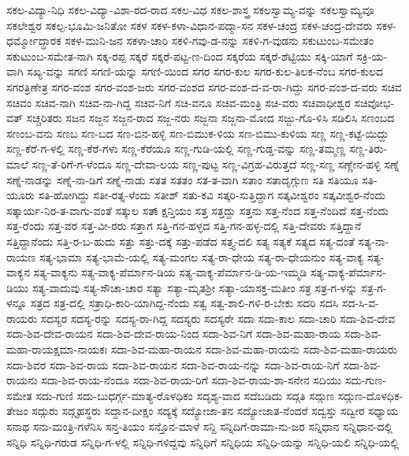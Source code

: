 ಸಕಲ-ವಿದ್ಯಾ-ನಿಧಿ
ಸಕಲ-ವಿದ್ಯಾ-ವಿಶಾ-ರದ-ರಾದ
ಸಕಲ-ವಿಧ
ಸಕಲ-ಶಾಸ್ತ್ರ
ಸಕಲಸ್ವಾಮ್ಯ-ವನ್ನು
ಸಕಲಸ್ವಾಮ್ಯವೂ
ಸಕಲೇಶ್ವರ
ಸಕಲ್ಪ-ಭೂಮಿ-ಜನಿತೋ
ಸಕಳ
ಸಕಳ-ಕಳಾ-ವಿಧಾನ-ಪದ್ಮಾ-ಸನ
ಸಕಳ-ಚಂದ್ರ
ಸಕಳ-ಚಂದ್ರ-ದೇವರು
ಸಕಳ-ಧರ್ಮ್ಮೋದ್ಧಾರಕ
ಸಕಳ-ಮುನಿ-ಜನ
ಸಕಳಾ-ಚಾರಿ
ಸಕಳಿ-ಗವು-ಡ-ನನ್ನು
ಸಕಳಿ-ಗ-ವುಡನು
ಸಕುಟುಂಬ-ಸಮೇತಂ
ಸಕುಟುಂಬ-ಸಮೇತ-ನಾಗಿ
ಸಕ್ಕ-ರಪ್ಪ
ಸಕ್ಕರೆ
ಸಕ್ಕರೆ-ಪಟ್ಟ-ಣ-ದಿಂದ
ಸಕ್ಕರೆಯ
ಸಕ್ಕರೆ-ಶೆಟ್ಟಿಯು
ಸಕ್ಕಿ-ಯಾಗೆ
ಸಕ್ರಿ-ಯ-ವಾಗಿ
ಸಖ್ಯ-ವನ್ನು
ಸಗಣಿ
ಸಗಣಿ-ಯನ್ನು
ಸಗಣಿ-ಯಿಂದ
ಸಗರ
ಸಗರ-ಕುಲ
ಸಗರ-ಕುಲ-ತಿಲಕ-ನೆಂಬ
ಸಗರ-ಕುಲದ
ಸಗರತ್ರಿಣೇತ್ರ
ಸಗರ-ವಂಶ
ಸಗರ-ವಂಶ-ಜರು
ಸಗರ-ವಂಶದ
ಸಗರ-ವಂಶ-ದ-ವ-ರಾ-ಗಿದ್ದು
ಸಗರ-ವಂಶ-ದ-ವರು
ಸಚಿವ
ಸಚಿವಂ
ಸಚಿವ-ನಾಗಿ
ಸಚಿವ-ನಾ-ಗಿದ್ದ
ಸಚಿವ-ನಿಗೆ
ಸಚಿ-ವನೂ
ಸಚಿವ-ಮಂತ್ರಿ
ಸಚಿ-ವರು
ಸಚಿವಾಧೀಶ್ವರ
ಸಚಿವೋಭ-ವತ್
ಸಚ್ಚರಿತರು
ಸಜನ
ಸಜ್ಜನ
ಸಜ್ಜನ-ರಾದ
ಸಜ್ಜ-ನರು
ಸಜ್ಜನಾ
ಸಜ್ಜನಾ-ಮೋದ
ಸಜ್ಜು-ಗೊ-ಳಿಸಿ
ಸಡಿಲಿಸಿ
ಸಣಂಬದ
ಸಣಂಬ-ವನು
ಸಣಬ
ಸಣ-ಬದ
ಸಣ-ಬಿನ-ಹಳ್ಳಿ
ಸಣ-ಬಿಮುಕ-ಳಿಯ
ಸಣ-ಬಿಮು-ಕುಳಿಯ
ಸಣ್ಣ
ಸಣ್ಣ-ಕಟ್ಟೆ-ಯಿದ್ದು
ಸಣ್ಣ-ಕೆರೆ-ಗ-ಳಲ್ಲಿ
ಸಣ್ಣ-ಕೆರೆ-ಗಳು
ಸಣ್ಣ-ಕೆರೆಯೂ
ಸಣ್ಣ-ಗುಡಿ-ಯಲ್ಲಿ
ಸಣ್ಣ-ಗುಡ್ಡ-ವನ್ನು
ಸಣ್ಣ-ತಮ್ಮಣ್ಣ
ಸಣ್ಣ-ತಿರು-ಮಾಲೆ
ಸಣ್ಣ-ತೆ-ರಿಗೆ-ಗ-ಳೆಂದೂ
ಸಣ್ಣ-ದೇವಾ-ಲಯ
ಸಣ್ಣ-ಪುಟ್ಟ
ಸಣ್ಣ-ವಿಗ್ರಹ-ವಿರುತ್ತದೆ
ಸಣ್ಣ-ಸಣ್ಣ
ಸಣ್ಣೇನ-ಹಳ್ಳಿ
ಸಣ್ನೆ
ಸಣ್ನೆ-ನಾಡನ್ನು
ಸಣ್ನೆ-ನಾ-ಡಿಗೆ
ಸಣ್ನೆ-ನಾಡು
ಸತತ
ಸತತಂ
ಸತ-ತ-ವಾಗಿ
ಸತಾಂ
ಸತಾದೃಗ್ಗುಣ
ಸತಿ
ಸತಿಯೂ
ಸತಿ-ಯೂರು
ಸತಿ-ಹೋಗಿದ್ದು
ಸತೀ-ರತ್ನ-ಳೆಂದು
ಸತೀಶ್
ಸತು-ಕವಿ
ಸತ್ಕರಿ-ಸುತ್ತಿದ್ದಾಗ
ಸತ್ಕವೀಶ್ವರಂ
ಸತ್ಕವೀಶ್ವರ-ನೆಂದು
ಸತ್ಕಾರ್ಯ-ನಿರ-ತ-ವಾಗು-ವಂತೆ
ಸತ್ಕುಲ
ಸತ್ಕ್ಷಾನ್ತಿಯಂ
ಸತ್ತ
ಸತ್ತದ್ದು
ಸತ್ತನು
ಸತ್ತ-ನೆಂದ
ಸತ್ತ-ನೆಂದಿದೆ
ಸತ್ತ-ನೆಂದು
ಸತ್ತ-ರೆಂದು
ಸತ್ತ-ವರ
ಸತ್ತ-ವೀ-ರರು
ಸತ್ತಾಗ
ಸತ್ತಿ-ಗನ-ಹಳ್ಳದ
ಸತ್ತಿ-ಗನ-ಹಳ್ಳ-ದಲ್ಲಿ
ಸತ್ತಿ-ದೇವರು
ಸತ್ತಿದ್ದಾನೆ
ಸತ್ತಿದ್ದಾನೆಂದು
ಸತ್ತಿ-ರ-ಬ-ಹುದು
ಸತ್ತು
ಸತ್ತು-ದಕ್ಕೆ
ಸತ್ತು-ಪಡೆದ
ಸತ್ತ್ಯ-ದಲಿ
ಸತ್ಯ
ಸತ್ಯಕೆ
ಸತ್ಯದ
ಸತ್ಯ-ದಂತೆ
ಸತ್ಯ-ನಾ-ರಾಯಣ
ಸತ್ಯ-ಭಾಮಾ
ಸತ್ಯ-ಭಾಮೆ-ಯಲ್ಲಿ
ಸತ್ಯ-ಮಂಗಲ
ಸತ್ಯ-ರಾ-ಧೇಯ
ಸತ್ಯ-ರಾ-ಧೇಯನುಂ
ಸತ್ಯ-ವಾಕ್ಯ
ಸತ್ಯ-ವಾಕ್ಯನ
ಸತ್ಯ-ವಾಕ್ಯನು
ಸತ್ಯ-ವಾಕ್ಯ-ಪೆರ್ಮಾನ-ಡಿಯ
ಸತ್ಯ-ವಾಕ್ಯ-ಪೆರ್ಮಾನ-ಡಿ-ಯ-ಇಮ್ಮಡಿ
ಸತ್ಯ-ವಾಕ್ಯ-ಪೆರ್ಮಾನ-ಡಿಯು
ಸತ್ಯ-ವಾದುವು
ಸತ್ಯ-ಸೌಚಾ-ಚಾರ
ಸತ್ಯಾ
ಸತ್ಯಾ-ಮೃತಶ್ರೀ
ಸತ್ಯಾ-ಯಾಸಕ್ತ-ಮತೀಂ
ಸತ್ರ
ಸತ್ರ-ಗ-ಳನ್ನು
ಸತ್ರ-ಗ-ಳನ್ನೂ
ಸತ್ರದ
ಸತ್ರ-ದಲ್ಲಿ
ಸತ್ರಾಧಿ-ಕಾರಿ-ಯಾಗಿದ್ದ-ನೆಂದು
ಸತ್ವ
ಸತ್ವ-ಶಾಲಿ-ಗಳಿ-ರ-ಬೇಕು
ಸದರಿ
ಸದಸಿ
ಸದ-ಸಿ-ವ-ರಾಯರು
ಸದಸ್ಯರ
ಸದಸ್ಯ-ರನ್ನು
ಸದಸ್ಯ-ರಾ-ಗಿದ್ದ
ಸದಸ್ಯರು
ಸದಸ್ಯರೇ
ಸದಾ
ಸದಾ-ಕಾಲ
ಸದಾ-ಚಾರಿ
ಸದಾ-ಶಿವ-ದೇವ
ಸದಾ-ಶಿವ-ದೇವ-ರಾಯನ
ಸದಾ-ಶಿವ-ದೇವ-ರಾಯ-ನಿಂದ
ಸದಾ-ಶಿವ-ನಿಗೆ
ಸದಾ-ಶಿವ-ಮಹಾ-ರಾಯ
ಸದಾ-ಶಿವ-ಮಹಾ-ರಾಯಕ್ಷಮಾ-ನಾಯಕಃ
ಸದಾ-ಶಿವ-ಮಹಾ-ರಾಯನ
ಸದಾ-ಶಿವ-ಮಹಾ-ರಾಯನು
ಸದಾ-ಶಿವ-ಮಹಾ-ರಾಯರು
ಸದಾ-ಶಿವರ
ಸದಾ-ಶಿವ-ರಾಯ
ಸದಾ-ಶಿವ-ರಾಯನ
ಸದಾ-ಶಿವ-ರಾಯ-ನನ್ನು
ಸದಾ-ಶಿವ-ರಾಯ-ನಿಗೆ
ಸದಾ-ಶಿವ-ರಾಯನು
ಸದಾ-ಶಿವ-ರಾಯ-ನೆಂದೂ
ಸದಾ-ಶಿವ-ರಾಯ-ರಿಗೆ
ಸದಾ-ಶಿವ-ರಾಯ-ಶಾ-ಸನೇನ
ಸದಿಯು
ಸದು-ಗುಣ-ಸಮೇತ
ಸದು-ಗುಣಿ
ಸದು-ಬುಧರ್ಗ್ಗ-ಮಾತ್ಯ-ರೊಳಧಿಕಂ
ಸದೃಶ್ಯ-ವಾದ
ಸದೆಬಡಿದು
ಸದ್ಗತಿ
ಸದ್ಗುಣ
ಸದ್ಗುಣ-ದೊಳಧಿಕ-ತೇಜಂ
ಸದ್ಗುರು
ಸದ್ಗೃಹಸ್ಥರು
ಸದ್ದಾನ-ದೀಕ್ಷಂ
ಸದ್ಯಕ್ಕೆ
ಸದ್ಯೋಜಾ-ತನ
ಸದ್ಯೋಜಾತ-ನೆಂದರೆ
ಸದ್ವಸ್ತು
ಸದ್ವೀರ
ಸಧ್ಯಾಯ
ಸನಾಥ
ಸನು-ಮಂತ್ರಿ-ಗಳೆನಿಸಿ
ಸನ್ತ-ತಿಯಂ
ಸನ್ತೊನ-ಮಾಳೆ
ಸನ್ದಿ
ಸನ್ನಿದಿಗೆ-ರಾಮಾ-ನು-ಜರ
ಸನ್ನಿಧಾನ
ಸನ್ನಿಧಾನ-ದಲ್ಲಿ
ಸನ್ನಿಧಿ
ಸನ್ನಿಧಿ-ಗರುಡ
ಸನ್ನಿಧಿ-ಗ-ಳಲ್ಲಿ
ಸನ್ನಿಧಿ-ಗಳಿದ್ದವು
ಸನ್ನಿಧಿಗೆ
ಸನ್ನಿಧಿಯ
ಸನ್ನಿಧಿ-ಯನ್ನು
ಸನ್ನಿಧಿ-ಯಲಿ
ಸನ್ನಿಧಿ-ಯಲ್ಲಿ
